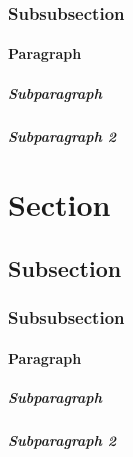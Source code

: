 \subsubsection{Subsubsection}
\paragraph{Paragraph}
\subparagraph{Subparagraph}
\subparagraph{Subparagraph 2}
\newpage

\section{Section}
\lipsum[1]
\subsection{Subsection}
\lipsum[2]
\subsubsection{Subsubsection}
\lipsum[3]
\paragraph{Paragraph}
\lipsum[4]
\subparagraph{Subparagraph}
\lipsum[5]
\subparagraph{Subparagraph 2}
\lipsum[6]

